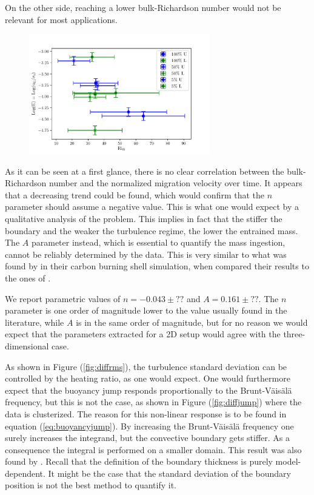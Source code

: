 On the other side, reaching a lower bulk-Richardson number would not be relevant for most applications.

\begin{figure}[t!]
\centering
\includegraphics[width=0.7\textwidth]{./img/differential2d.pdf}
\caption{}
\label{fig:differential}
\centering
\end{figure}

As it can be seen at a first glance, there is no clear correlation between the bulk-Richardson number and the normalized migration velocity over time. It appears that a decreasing trend could be found, which would confirm that the $n$ parameter should assume a negative value. This is what one would expect by a qualitative analysis of the problem. This implies in fact that the stiffer the boundary and the weaker the turbulence regime, the lower the entrained mass. The $A$ parameter instead, which is essential to quantify the mass ingestion, cannot be reliably determined by the data. This is very similar to what was found by \citet{cristini} in their carbon burning shell simulation, when compared their results to the ones of \citet{meakin}. 

We report parametric values of $n=-0.043 \pm ??$ and $A=0.161 \pm ??$. The $n$ parameter is one order of magnitude lower to the value usually found in the literature, while $A$ is in the same order of magnitude, but for no reason we would expect that the parameters extracted for a 2D setup would agree with the three-dimensional case.

As shown in Figure (\ref{fig:diffrms}), the turbulence standard deviation can be controlled by the heating ratio, as one would expect. One would furthermore expect that the buoyancy jump responds proportionally to the Brunt-Väisälä frequency, but this is not the case, as shown in Figure (\ref{fig:diffjump}) where the data is clusterized. The reason for this non-linear response is to be found in equation (\ref{eq:buoyancyjump}). By increasing the Brunt-Väisälä frequency one surely increases the integrand, but the convective boundary gets stiffer. As a consequence the integral is performed on a smaller domain. This result was also found by \citet{arnett2009}. Recall that the definition of the boundary thickness is purely model-dependent. It might be the case that the standard deviation of the boundary position is not the best method to quantify it.

